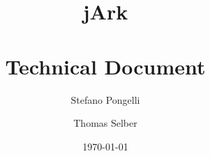 \documentclass{report}
\begin{document}
\title{\Huge jArk\\~\\\large Technical Document \normalsize}
\author{Stefano Pongelli \and Thomas Selber}
\date{\today}
\maketitle
\tableofcontents





\end{document}
